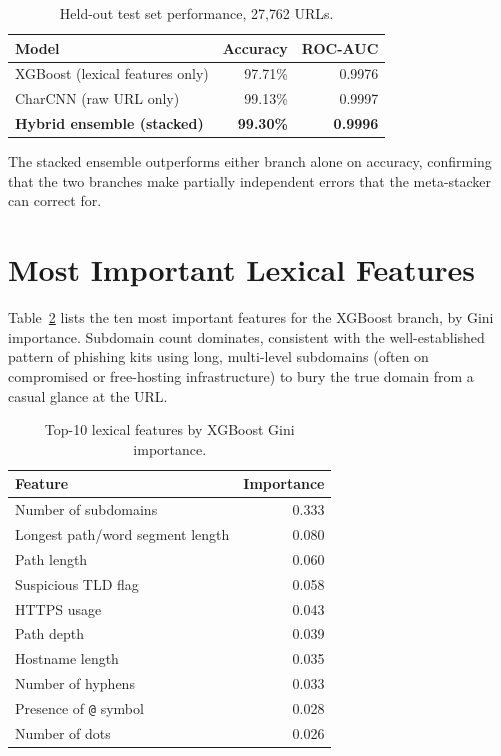 \documentclass[11pt,a4paper]{report}
\begin{document}
\begin{table}[H]
\centering
\begin{tabular}{lrr}
\toprule
\textbf{Model} & \textbf{Accuracy} & \textbf{ROC-AUC} \\
\midrule
XGBoost (lexical features only) & 97.71\% & 0.9976 \\
CharCNN (raw URL only) & 99.13\% & 0.9997 \\
\textbf{Hybrid ensemble (stacked)} & \textbf{99.30\%} & \textbf{0.9996} \\
\bottomrule
\end{tabular}
\caption{Held-out test set performance, 27{,}762 URLs.}
\label{tab:results}
\end{table}

The stacked ensemble outperforms either branch alone on accuracy, confirming that the
two branches make partially independent errors that the meta-stacker can correct for.

\section{Most Important Lexical Features}
Table~\ref{tab:features} lists the ten most important features for the XGBoost
branch, by Gini importance. Subdomain count dominates, consistent with the
well-established pattern of phishing kits using long, multi-level subdomains
(often on compromised or free-hosting infrastructure) to bury the true domain from a
casual glance at the URL.

\begin{table}[H]
\centering
\begin{tabular}{lr}
\toprule
\textbf{Feature} & \textbf{Importance} \\
\midrule
Number of subdomains & 0.333 \\
Longest path/word segment length & 0.080 \\
Path length & 0.060 \\
Suspicious TLD flag & 0.058 \\
HTTPS usage & 0.043 \\
Path depth & 0.039 \\
Hostname length & 0.035 \\
Number of hyphens & 0.033 \\
Presence of \texttt{@} symbol & 0.028 \\
Number of dots & 0.026 \\
\bottomrule
\end{tabular}
\caption{Top-10 lexical features by XGBoost Gini importance.}
\label{tab:features}
\end{table}
\end{document}
